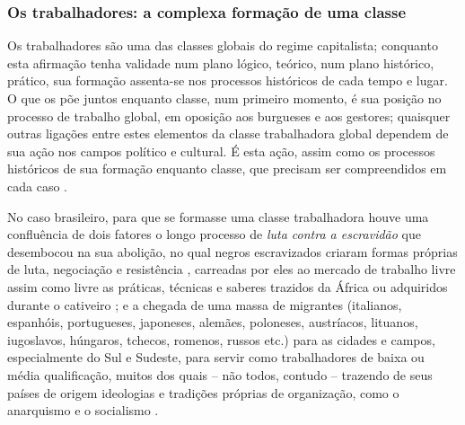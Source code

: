 \subsubsection{Os trabalhadores: a complexa formação de uma classe}\label{subsubsec:clatrab}

Os trabalhadores são uma das classes globais do regime capitalista; conquanto esta afirmação tenha validade num plano lógico, teórico, num plano histórico, prático, sua formação assenta-se nos processos históricos de cada tempo e lugar. O que os põe juntos enquanto classe, num primeiro momento, é sua posição no processo de trabalho global, em oposição aos burgueses e aos gestores; quaisquer outras ligações entre estes elementos da classe trabalhadora global dependem de sua ação nos campos político e cultural. É esta ação, assim como os processos históricos de sua formação enquanto classe, que precisam ser compreendidos em cada caso \cite{aguiar_classe_2009}.

No caso brasileiro, para que se formasse uma classe trabalhadora houve uma confluência de dois fatores \cite[p.~27]{chalhoub_botequim_1986} o longo processo de \textit{luta contra a escravidão} que desembocou na sua abolição, no qual negros escravizados criaram formas próprias de luta, negociação e resistência \cite{AZEVEDO2004, bethell_trafico_2002, chalhoub_liberdade_1990, conrad_ultimosanos_1978, farias_cidadesnegras_2006, fraga_encruzilhadas_2014, luna_lutaescravidao_1976, reis_elitemovsoc_1976, REISSILVA1989, REIS2004males, reis_familiareal_2008, schwartz_1814_1996, silva2007caminhos}, carreadas por eles ao mercado de trabalho livre assim como livre as práticas, técnicas e saberes trazidos da África ou adquiridos durante o cativeiro \cite{fraga_encruzilhadas_2014, souza_trabalholivre_2011, REIS2012}; e a chegada de uma massa de migrantes (italianos, espanhóis, portugueses, japoneses, alemães, poloneses, austríacos, lituanos, iugoslavos, húngaros, tchecos, romenos, russos etc.) para as cidades e campos, especialmente do Sul e Sudeste, para servir como trabalhadores de baixa ou média qualificação, muitos dos quais -- não todos, contudo -- trazendo de seus países de origem ideologias e tradições próprias de organização, como o anarquismo e o socialismo \cite{petrone_imigra_1977}.

